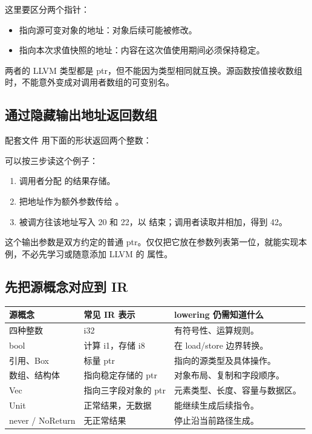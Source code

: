 这里要区分两个指针：
\begin{itemize}
 \item 指向源可变对象的地址：对象后续可能被修改。
 \item 指向本次求值快照的地址：内容在这次值使用期间必须保持稳定。
\end{itemize}
两者的 LLVM 类型都是 ptr，但不能因为类型相同就互换。源函数按值接收数组时，不能意外变成对调用者数组的可变别名。

\subsection{通过隐藏输出地址返回数组}
配套文件  用下面的形状返回两个整数：


可以按三步读这个例子：
\begin{enumerate}
 \item 调用者分配 \code{[2 x i32]} 的结果存储。
 \item 把地址作为额外参数传给 。
 \item 被调方往该地址写入 20 和 22，以  结束；调用者读取并相加，得到 42。
\end{enumerate}
这个输出参数是双方约定的普通 ptr。仅仅把它放在参数列表第一位，就能实现本例，不必先学习或随意添加 LLVM 的  属性。



\subsection{先把源概念对应到 IR}
\begin{tabularx}{\linewidth}{@{}p{31mm}p{45mm}Y@{}}
\toprule
源概念 & 常见 IR 表示 & lowering 仍需知道什么 \\
\midrule
四种整数 & i32 & 有符号性、运算规则。\\
bool & 计算 i1，存储 i8 & 在 load/store 边界转换。\\
引用、Box & 标量 ptr & 指向的源类型及具体操作。\\
数组、结构体 & 指向稳定存储的 ptr & 对象布局、复制和字段顺序。\\
Vec & 指向三字段对象的 ptr & 元素类型、长度、容量与数据区。\\
Unit & 正常结果，无数据 & 能继续生成后续指令。\\
never / NoReturn & 无正常结果 & 停止沿当前路径生成。\\
\bottomrule
\end{tabularx}

